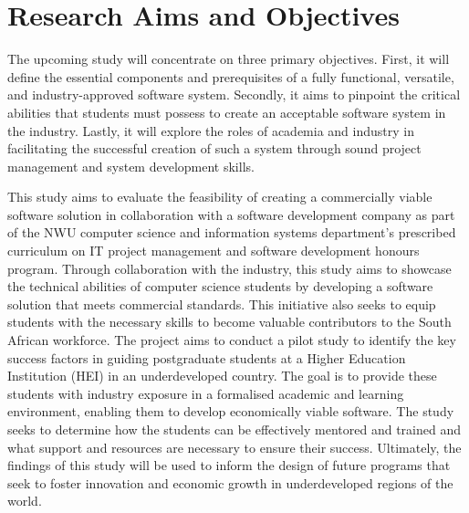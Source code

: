 \section{Research Aims and Objectives}
\par{The upcoming study will concentrate on three primary objectives. First, it will define the essential components and prerequisites of a fully functional, versatile, and industry-approved software system. Secondly, it aims to pinpoint the critical abilities that students must possess to create an acceptable software system in the industry. Lastly, it will explore the roles of academia and industry in facilitating the successful creation of such a system through sound project management and system development skills.}
\par{This study aims to evaluate the feasibility of creating a commercially viable software solution in
collaboration with a software development company as part of the NWU computer science and information systems department's prescribed curriculum on IT project management and software development honours program. Through collaboration with the industry, this study aims to showcase the technical abilities of computer science students by developing a software solution that meets commercial standards. This initiative also seeks to equip students with the necessary skills to become valuable contributors to the South African workforce. The project aims to conduct a pilot study to identify the key success factors in guiding postgraduate students at a Higher Education Institution (HEI) in an underdeveloped country. The goal is to provide these students with industry exposure in a formalised academic and learning environment, enabling them to develop economically viable software. The study seeks to determine how the students can be effectively mentored and trained and what support and resources are necessary to ensure their success.
Ultimately, the findings of this study will be used to inform the design of future programs that seek to foster innovation and economic growth in underdeveloped regions of the world.}
